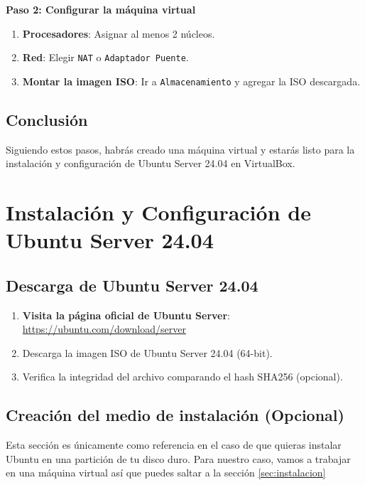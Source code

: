 \documentclass{article}
\begin{document}
\textbf{Paso 2: Configurar la máquina virtual}
\begin{enumerate}
    \item \textbf{Procesadores}: Asignar al menos 2 núcleos.
    \item \textbf{Red}: Elegir \texttt{NAT} o \texttt{Adaptador Puente}.
    \item \textbf{Montar la imagen ISO}: Ir a \texttt{Almacenamiento} y agregar la ISO descargada.
\end{enumerate}

\subsection{Conclusión}
Siguiendo estos pasos, habrás creado una máquina virtual y estarás listo para la instalación y configuración de Ubuntu Server 24.04 en VirtualBox. 

\section{Instalación y Configuración de Ubuntu Server 24.04}

\subsection{Descarga de Ubuntu Server 24.04}
\begin{enumerate}
    \item \textbf{Visita la página oficial de Ubuntu Server}: \href{https://ubuntu.com/download/server}{https://ubuntu.com/download/server}
    \item Descarga la imagen ISO de Ubuntu Server 24.04 (64-bit).
    \item Verifica la integridad del archivo comparando el hash SHA256 (opcional).
\end{enumerate}

\subsection{Creación del medio de instalación (Opcional)}
Esta sección es únicamente como referencia en el caso de que quieras instalar Ubuntu en una partición de tu disco duro.  Para nuestro caso, vamos a trabajar en una máquina virtual así que puedes saltar a la sección \ref{sec:instalacion}
\end{document}
